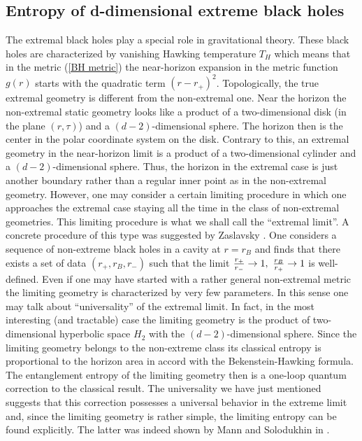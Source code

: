\documentclass[12pt]{article}
\begin{document}
\subsection{ Entropy of d-dimensional extreme black holes}
The extremal black holes  play a special role in gravitational theory.  These black holes are characterized by vanishing Hawking temperature $T_H$ which means that in the metric
(\ref{BH metric}) the near-horizon expansion in the metric function $g(r)$ starts with the quadratic term $(r-r_+)^2$. Topologically, the true extremal geometry is different from the non-extremal one.  Near the horizon the non-extremal static geometry looks like a product of a two-dimensional disk (in the plane $(r,\tau)$) and a $(d-2)$-dimensional sphere.
The horizon then is the center in the polar coordinate system on the disk.  Contrary to this, an extremal geometry in the near-horizon limit is a product of a two-dimensional cylinder
and a $(d-2)$-dimensional sphere. Thus, the horizon in the extremal case is just another boundary rather than a regular inner point as in the non-extremal geometry.
However, one may consider a certain limiting procedure in which one approaches the extremal case staying all the time in the class of non-extremal geometries. This limiting procedure is what we shall call the ``extremal limit''. A concrete procedure of this type was suggested by Zaslavsky  \cite{Zaslavsky:1997ha}.
One considers a sequence of non-extreme black holes in a cavity at $r=r_B$ and finds that there  exists a set of data $(r_+,r_B,r_-)$ such that the limit
${r_+\over r_-}\rightarrow 1,~{r_B\over r_+}\rightarrow 1$ is well-defined.
 Even if one may have started with a rather general non-extremal metric the limiting geometry is characterized by very few parameters. In this sense one may talk about ``universality'' of the extremal limit. In fact, in the most interesting (and tractable) case the limiting geometry is the product of two-dimensional hyperbolic space $H_2$ with the $(d-2)$-dimensional sphere.  Since the limiting geometry belongs to the non-extreme class its classical  entropy is proportional to the horizon area in accord with the Bekenstein-Hawking formula. The entanglement entropy of the limiting geometry then is a one-loop quantum correction to the classical result. The universality we have just mentioned suggests that this correction possesses a universal behavior in the extreme limit and, since the limiting geometry is rather simple, the limiting entropy can be found explicitly. The latter was indeed shown by Mann and Solodukhin in \cite{Mann:1997hm}.
\end{document}
